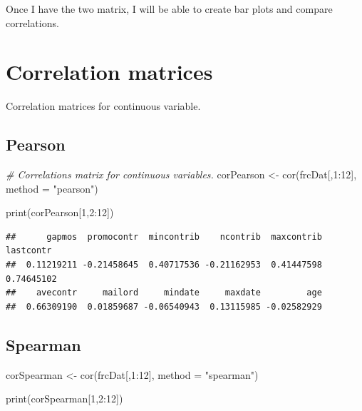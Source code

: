 \documentclass[
]{article}
\newenvironment{Shaded}{\begin{snugshade}}{\end{snugshade}}
\newcommand{\AttributeTok}[1]{\textcolor[rgb]{0.77,0.63,0.00}{#1}}
\newcommand{\CommentTok}[1]{\textcolor[rgb]{0.56,0.35,0.01}{\textit{#1}}}
\newcommand{\DecValTok}[1]{\textcolor[rgb]{0.00,0.00,0.81}{#1}}
\newcommand{\FunctionTok}[1]{\textcolor[rgb]{0.00,0.00,0.00}{#1}}
\newcommand{\NormalTok}[1]{#1}
\newcommand{\OtherTok}[1]{\textcolor[rgb]{0.56,0.35,0.01}{#1}}
\newcommand{\SpecialCharTok}[1]{\textcolor[rgb]{0.00,0.00,0.00}{#1}}
\newcommand{\StringTok}[1]{\textcolor[rgb]{0.31,0.60,0.02}{#1}}
\begin{document}
Once I have the two matrix, I will be able to create bar plots and
compare correlations.

\hypertarget{correlation-matrices}{%
\section{Correlation matrices}\label{correlation-matrices}}

Correlation matrices for continuous variable.

\hypertarget{pearson}{%
\subsection{Pearson}\label{pearson}}

\begin{Shaded}
\begin{Highlighting}[]
\CommentTok{\# Correlations matrix for continuous variables.}
\NormalTok{corPearson }\OtherTok{\textless{}{-}} \FunctionTok{cor}\NormalTok{(frcDat[,}\DecValTok{1}\SpecialCharTok{:}\DecValTok{12}\NormalTok{],}
                \AttributeTok{method =} \StringTok{"pearson"}\NormalTok{)}


\FunctionTok{print}\NormalTok{(corPearson[}\DecValTok{1}\NormalTok{,}\DecValTok{2}\SpecialCharTok{:}\DecValTok{12}\NormalTok{])}
\end{Highlighting}
\end{Shaded}

\begin{verbatim}
##      gapmos  promocontr  mincontrib    ncontrib  maxcontrib   lastcontr 
##  0.11219211 -0.21458645  0.40717536 -0.21162953  0.41447598  0.74645102 
##    avecontr     mailord     mindate     maxdate         age 
##  0.66309190  0.01859687 -0.06540943  0.13115985 -0.02582929
\end{verbatim}

\hypertarget{spearman}{%
\subsection{Spearman}\label{spearman}}

\begin{Shaded}
\begin{Highlighting}[]
\NormalTok{corSpearman }\OtherTok{\textless{}{-}} \FunctionTok{cor}\NormalTok{(frcDat[,}\DecValTok{1}\SpecialCharTok{:}\DecValTok{12}\NormalTok{],}
                 \AttributeTok{method =} \StringTok{"spearman"}\NormalTok{)}

\FunctionTok{print}\NormalTok{(corSpearman[}\DecValTok{1}\NormalTok{,}\DecValTok{2}\SpecialCharTok{:}\DecValTok{12}\NormalTok{])}
\end{Highlighting}
\end{Shaded}
\end{document}
